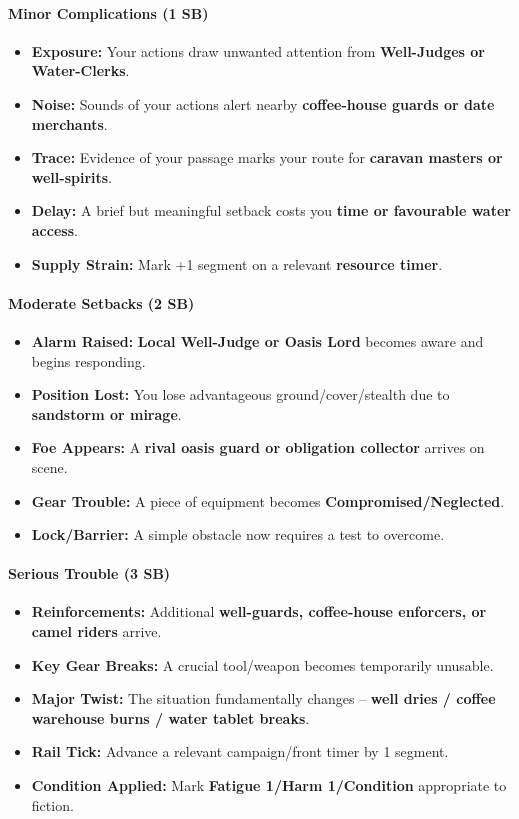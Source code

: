 \paragraph{Minor Complications (1 SB)}
\begin{itemize}
\item \textbf{Exposure:} Your actions draw unwanted attention from \textbf{Well-Judges or Water-Clerks}.
\item \textbf{Noise:} Sounds of your actions alert nearby \textbf{coffee-house guards or date merchants}.
\item \textbf{Trace:} Evidence of your passage marks your route for \textbf{caravan masters or well-spirits}.
\item \textbf{Delay:} A brief but meaningful setback costs you \textbf{time or favourable water access}.
\item \textbf{Supply Strain:} Mark +1 segment on a relevant \textbf{resource timer}.
\end{itemize}

\paragraph{Moderate Setbacks (2 SB)}
\begin{itemize}
\item \textbf{Alarm Raised:} \textbf{Local Well-Judge or Oasis Lord} becomes aware and begins responding.
\item \textbf{Position Lost:} You lose advantageous ground/cover/stealth due to \textbf{sandstorm or mirage}.
\item \textbf{Foe Appears:} A \textbf{rival oasis guard or obligation collector} arrives on scene.
\item \textbf{Gear Trouble:} A piece of equipment becomes \textbf{Compromised/Neglected}.
\item \textbf{Lock/Barrier:} A simple obstacle now requires a test to overcome.
\end{itemize}

\paragraph{Serious Trouble (3 SB)}
\begin{itemize}
\item \textbf{Reinforcements:} Additional \textbf{well-guards, coffee-house enforcers, or camel riders} arrive.
\item \textbf{Key Gear Breaks:} A crucial tool/weapon becomes temporarily unusable.
\item \textbf{Major Twist:} The situation fundamentally changes -- \textbf{well dries / coffee warehouse burns / water tablet breaks}.
\item \textbf{Rail Tick:} Advance a relevant campaign/front timer by 1 segment.
\item \textbf{Condition Applied:} Mark \textbf{Fatigue 1/Harm 1/Condition} appropriate to fiction.
\end{itemize}


